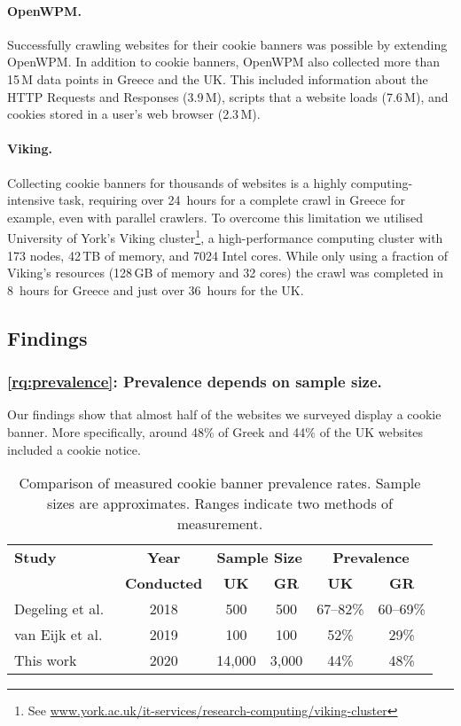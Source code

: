 \paragraph{OpenWPM.}

Successfully crawling websites for their cookie banners was possible by extending OpenWPM. In addition to cookie banners, OpenWPM also collected  more than 15\,M data points in Greece and the UK. This included information about the HTTP Requests and Responses (3.9\,M), scripts that a website loads (7.6\,M), and cookies stored in a user's web browser (2.3\,M). 

\paragraph{Viking.}
Collecting cookie banners for thousands of websites is a highly computing-intensive task, requiring over 24~hours for a complete crawl in Greece for example, even with parallel crawlers. To overcome this limitation we utilised University of York's Viking cluster\footnote{See \url{www.york.ac.uk/it-services/research-computing/viking-cluster}}, a high-performance computing cluster with 173 nodes, 42\,TB of memory, and 7024 Intel cores. While only using a fraction of Viking's resources (128\,GB of memory and 32 cores) the crawl was completed in 8~hours for Greece and just over 36~hours for the UK.

\subsection{Findings}
\subsubsection{\ref{rq:prevalence}: Prevalence depends on sample size.}
Our findings show that almost half of the websites we surveyed display a cookie banner. More specifically, around 48\% of Greek and 44\% of the UK websites included a cookie notice. 

\begin{table}[t]
    \centering
    \caption{Comparison of measured cookie banner prevalence rates. Sample sizes are approximates. Ranges indicate two methods of measurement.}
    \begin{tabular}{@{}l@{\quad}c@{\quad}c@{\quad}c@{\quad}c@{\quad}c@{}}
        \toprule
        \textbf{Study} & \textbf{Year} & \multicolumn{2}{c}{\textbf{Sample Size}} & \multicolumn{2}{c}{\textbf{Prevalence}} \\ 
        & \textbf{Conducted} & \textbf{UK} & \textbf{GR} & \textbf{UK} & \textbf{GR} \\ 
        \midrule 
        Degeling et al.~\cite{degeling2018we} & 2018 & 500 & 500 & 67--82\% & 60--69\% \\ 
        van Eijk et al.~\cite{eijk2019impact} & 2019 & 100 & 100 & 52\% & 29\% \\ 
        This work & 2020 & 14,000 & 3,000 & 44\% & 48\% \\ 
        \bottomrule
    \end{tabular}
    \label{tab:prev-comp}
\end{table}


